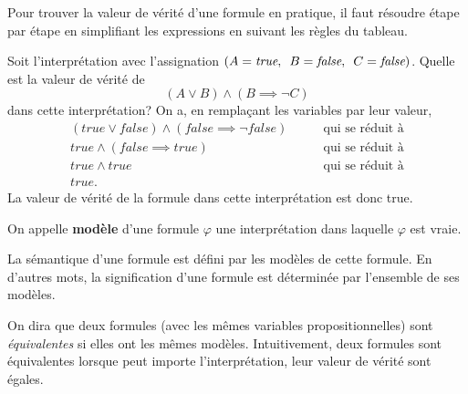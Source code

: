 Pour trouver la valeur de vérité d'une formule en pratique, il faut résoudre étape par étape en simplifiant les expressions en suivant les règles du tableau.
\begin{myexem}
Soit l'interprétation avec l'assignation $(A=\textit{true},\enskip B=\textit{false}, \enskip C=\textit{false})$. Quelle est la valeur de vérité de 
\begin{equation*}
(A\lor B)\land(B \implies \neg C)
\end{equation*}
dans cette interprétation? On a, en remplaçant les variables par leur valeur,
\begin{align*}
(true \lor false) \land (false \implies \neg false) \qquad &\text{qui se réduit à} \\
true\land (false \implies true) \qquad &\text{qui se réduit à}\\
true \land true \qquad &\text{qui se réduit à} \\
true. \qquad &
\end{align*}
La valeur de vérité de la formule dans cette interprétation est donc true.
\end{myexem}
\begin{mydef}
On appelle \textbf{modèle} d'une formule $\varphi$ une interprétation dans laquelle $\varphi$ est vraie.
\end{mydef}
La sémantique d'une formule est défini par les modèles de cette formule. En d'autres mots, la signification d'une formule est déterminée par l'ensemble de ses modèles. 
\smallskip

On dira que deux formules (avec les mêmes variables propositionnelles) sont \textit{équivalentes} si elles ont les mêmes modèles. Intuitivement, deux formules sont équivalentes lorsque peut importe l'interprétation, leur valeur de vérité sont égales. \smallskip


